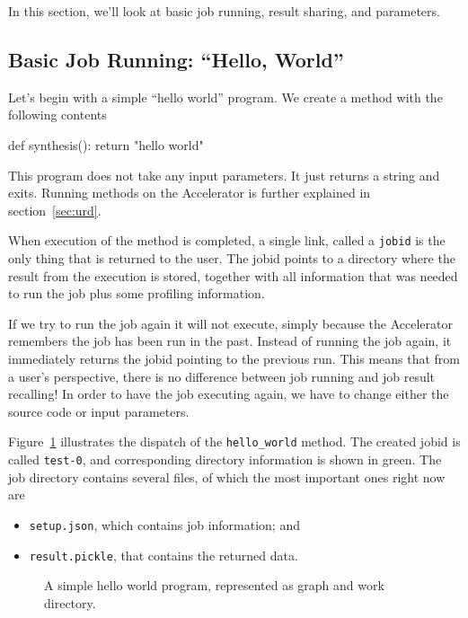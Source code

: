In this section, we'll look at basic job running, result sharing, and
parameters.


\subsection{Basic Job Running:  ``Hello, World''}

Let's begin with a simple ``hello world'' program.  We create a method
with the following contents
\begin{python}
def synthesis():
    return "hello world"
\end{python}
This program does not take any input parameters.  It just returns a
string and exits.  Running methods on the Accelerator is further
explained in section~\ref{sec:urd}.

When execution of the method is completed, a single link, called a
\texttt{jobid} is the only thing that is returned to the user.  The
jobid points to a directory where the result from the execution is
stored, together with all information that was needed to run the job
plus some profiling information.

If we try to run the job again it will not execute, simply because the
Accelerator remembers the job has been run in the past.  Instead of
running the job again, it immediately returns the jobid pointing to
the previous run.  This means that from a user's perspective, there is
no difference between job running and job result recalling!  In order
to have the job executing again, we have to change either the source
code or input parameters.

Figure~\ref{fig:execflow-hello-world} illustrates the dispatch of the
\texttt{hello\_world} method.  The created jobid is called
\texttt{test-0}, and corresponding directory information is shown in
green.  The job directory contains several files, of which the most
important ones right now are
\begin{itemize}
\item[] \texttt{setup.json}, which contains job information; and
\item[] \texttt{result.pickle}, that contains the returned data.
\end{itemize}

\begin{figure}[h!]
  \begin{center}
    
    \caption{A simple hello world program, represented as graph and
      work directory.}
    \label{fig:execflow-hello-world}
  \end{center}
\end{figure}







